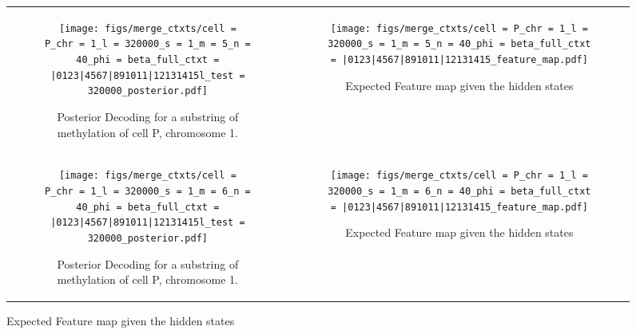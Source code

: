 \documentclass{article}
\begin{document}
\begin{figure}[H]
    \begin{tabular}{cc}
      \begin{subfigure}[t]{0.4\textwidth}
        \texttt{[image: figs/merge\_ctxts/cell = P\_chr = 1\_l = 320000\_s = 1\_m = 5\_n = 40\_phi = beta\_full\_ctxt = |0123|4567|891011|12131415l\_test = 320000\_posterior.pdf]}
        \caption{Posterior Decoding for a substring of methylation of cell P, chromosome 1.}
      \end{subfigure}
      &
      \begin{subfigure}[t]{0.6\textwidth}
        \texttt{[image: figs/merge\_ctxts/cell = P\_chr = 1\_l = 320000\_s = 1\_m = 5\_n = 40\_phi = beta\_full\_ctxt = |0123|4567|891011|12131415\_feature\_map.pdf]}
        \caption{Expected Feature map given the hidden states}
      \end{subfigure}
      \\
      \begin{subfigure}[t]{0.4\textwidth}
        \texttt{[image: figs/merge\_ctxts/cell = P\_chr = 1\_l = 320000\_s = 1\_m = 6\_n = 40\_phi = beta\_full\_ctxt = |0123|4567|891011|12131415l\_test = 320000\_posterior.pdf]}
        \caption{Posterior Decoding for a substring of methylation of cell P, chromosome 1.}
      \end{subfigure}
      &
      \begin{subfigure}[t]{0.6\textwidth}
        \texttt{[image: figs/merge\_ctxts/cell = P\_chr = 1\_l = 320000\_s = 1\_m = 6\_n = 40\_phi = beta\_full\_ctxt = |0123|4567|891011|12131415\_feature\_map.pdf]}
        \caption{Expected Feature map given the hidden states}
      \end{subfigure}
  \end{tabular}
\end{figure}
\end{document}
